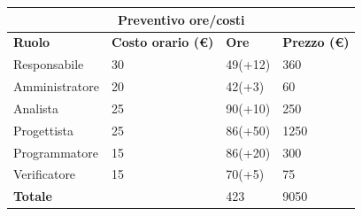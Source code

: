 \documentclass[a4paper, 12pt]{article}
\begin{document}
\begin{center}
	\begin{tabularx}{\textwidth}{|X|X|X|X|}
		\hline
		\multicolumn{4}{|c|}{\textbf{Preventivo ore/costi}}                                      \\
		\hline
		\hline
		\textbf{Ruolo}  & \textbf{Costo orario (\euro)} & \textbf{Ore} & \textbf{Prezzo (\euro)} \\
		\hline
		Responsabile    & 30                            & 49(+12)       & 360                      \\
		\hline
		Amministratore  & 20                            & 42(+3)       & 60                      \\
		\hline
		Analista        & 25                            & 90(+10)       & 250                     \\
		\hline
		Progettista     & 25                            & 86(+50)       & 1250                     \\
		\hline
		Programmatore   & 15                            & 86(+20)      & 300                    \\
		\hline
		Verificatore    & 15                            & 70(+5)       & 75                      \\
		\hline
		\hline
		\textbf{Totale} &                               & 423          & 9050                    \\
		\hline
	\end{tabularx}\\[8pt]
	\mbox{}\\
\end{center}
\end{document}
